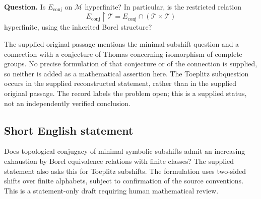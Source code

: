 \documentclass[11pt]{article}
\begin{document}
\textbf{Question.} Is \(E_{\mathrm{conj}}\) on \(\mathcal M\) hyperfinite? In particular, is the restricted relation
\[
E_{\mathrm{conj}}\!\upharpoonright\mathcal T
=E_{\mathrm{conj}}\cap(\mathcal T\times\mathcal T)
\]
hyperfinite, using the inherited Borel structure?

The supplied original passage mentions the minimal-subshift question and a connection with a conjecture of Thomas concerning isomorphism of complete groups. No precise formulation of that conjecture or of the connection is supplied, so neither is added as a mathematical assertion here. The Toeplitz subquestion occurs in the supplied reconstructed statement, rather than in the supplied original passage. The record labels the problem open; this is a supplied status, not an independently verified conclusion.
\subsection{Short English statement}
Does topological conjugacy of minimal symbolic subshifts admit an increasing exhaustion by Borel equivalence relations with finite classes? The supplied statement also asks this for Toeplitz subshifts. The formulation uses two-sided shifts over finite alphabets, subject to confirmation of the source conventions. This is a statement-only draft requiring human mathematical review.
\end{document}
